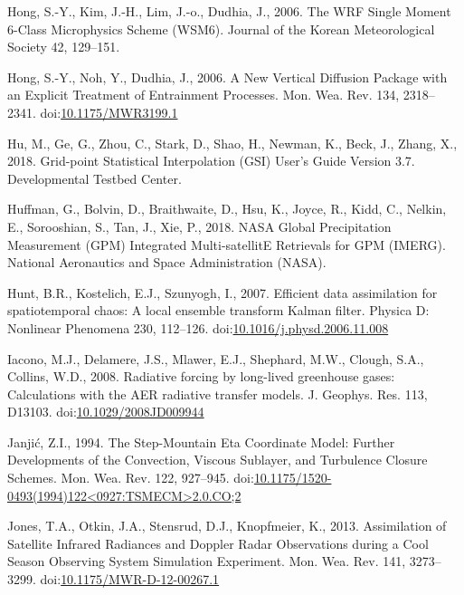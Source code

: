 \documentclass[final,5p,times,twocolumn,authoryear]{elsarticle} %
\begin{document}
\leavevmode\hypertarget{ref-hong2006a}{}%
Hong, S.-Y., Kim, J.-H., Lim, J.-o., Dudhia, J., 2006. The WRF Single Moment 6-Class Microphysics Scheme (WSM6). Journal of the Korean Meteorological Society 42, 129--151.

\leavevmode\hypertarget{ref-hong2006}{}%
Hong, S.-Y., Noh, Y., Dudhia, J., 2006. A New Vertical Diffusion Package with an Explicit Treatment of Entrainment Processes. Mon. Wea. Rev. 134, 2318--2341. doi:\href{https://doi.org/10.1175/MWR3199.1}{10.1175/MWR3199.1}

\leavevmode\hypertarget{ref-hu2018}{}%
Hu, M., Ge, G., Zhou, C., Stark, D., Shao, H., Newman, K., Beck, J., Zhang, X., 2018. Grid-point Statistical Interpolation (GSI) User's Guide Version 3.7. Developmental Testbed Center.

\leavevmode\hypertarget{ref-huffman2018}{}%
Huffman, G., Bolvin, D., Braithwaite, D., Hsu, K., Joyce, R., Kidd, C., Nelkin, E., Sorooshian, S., Tan, J., Xie, P., 2018. NASA Global Precipitation Measurement (GPM) Integrated Multi-satellitE Retrievals for GPM (IMERG). National Aeronautics and Space Administration (NASA).

\leavevmode\hypertarget{ref-hunt2007}{}%
Hunt, B.R., Kostelich, E.J., Szunyogh, I., 2007. Efficient data assimilation for spatiotemporal chaos: A local ensemble transform Kalman filter. Physica D: Nonlinear Phenomena 230, 112--126. doi:\href{https://doi.org/10.1016/j.physd.2006.11.008}{10.1016/j.physd.2006.11.008}

\leavevmode\hypertarget{ref-iacono2008}{}%
Iacono, M.J., Delamere, J.S., Mlawer, E.J., Shephard, M.W., Clough, S.A., Collins, W.D., 2008. Radiative forcing by long-lived greenhouse gases: Calculations with the AER radiative transfer models. J. Geophys. Res. 113, D13103. doi:\href{https://doi.org/10.1029/2008JD009944}{10.1029/2008JD009944}

\leavevmode\hypertarget{ref-janjic1994}{}%
Janjić, Z.I., 1994. The Step-Mountain Eta Coordinate Model: Further Developments of the Convection, Viscous Sublayer, and Turbulence Closure Schemes. Mon. Wea. Rev. 122, 927--945. doi:\href{https://doi.org/10.1175/1520-0493(1994)122\%3C0927:TSMECM\%3E2.0.CO;2}{10.1175/1520-0493(1994)122\textless0927:TSMECM\textgreater2.0.CO;2}

\leavevmode\hypertarget{ref-jones2013}{}%
Jones, T.A., Otkin, J.A., Stensrud, D.J., Knopfmeier, K., 2013. Assimilation of Satellite Infrared Radiances and Doppler Radar Observations during a Cool Season Observing System Simulation Experiment. Mon. Wea. Rev. 141, 3273--3299. doi:\href{https://doi.org/10.1175/MWR-D-12-00267.1}{10.1175/MWR-D-12-00267.1}
\end{document}
